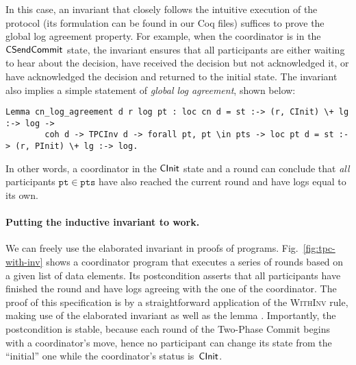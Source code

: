 
In this case, an invariant that closely follows the intuitive
execution of the protocol (its formulation can be found in our Coq
files) suffices to prove the global log agreement property.
%
For example, when the coordinator is in the $\mathsf{CSendCommit}$ state, the
invariant ensures that all participants are either waiting to hear
about the decision, have received the decision but not acknowledged
it, or have acknowledged the decision and returned to the initial state.
%
The invariant also implies a simple statement of \emph{global log agreement},
shown below:
%
\begin{lstlisting}[basicstyle=\footnotesize\ttfamily]
Lemma cn_log_agreement d r log pt : loc cn d = st :-> (r, CInit) \+ lg :-> log ->
        coh d -> TPCInv d -> forall pt, pt \in pts -> loc pt d = st :-> (r, PInit) \+ lg :-> log.
\end{lstlisting}
%
In other words, a coordinator  in the $\mathsf{CInit}$ state and a
round  can conclude that \emph{all} participants
{\small{$\mathtt{pt} \in \mathtt{pts}$}} have also reached the current
round  and have logs equal to its own.

\paragraph{Putting the inductive invariant to work.~}

We can freely use the elaborated invariant in proofs of programs.
%
Fig.~\ref{fig:tpc-with-inv} shows a coordinator program that executes
a series of rounds based on a given list  of data
elements.
%
Its postcondition asserts that all participants have finished the
round and have logs agreeing with the one of the coordinator.
%
The proof of this specification is by a straightforward application of
the \textsc{WithInv} rule, making use of the elaborated invariant
 as well as the lemma .
%
Importantly, the postcondition is stable, because each round of the
Two-Phase Commit begins with a coordinator's move, hence no
participant can change its state from the ``initial'' one while the
coordinator's status is~$\mathsf{CInit}$.

